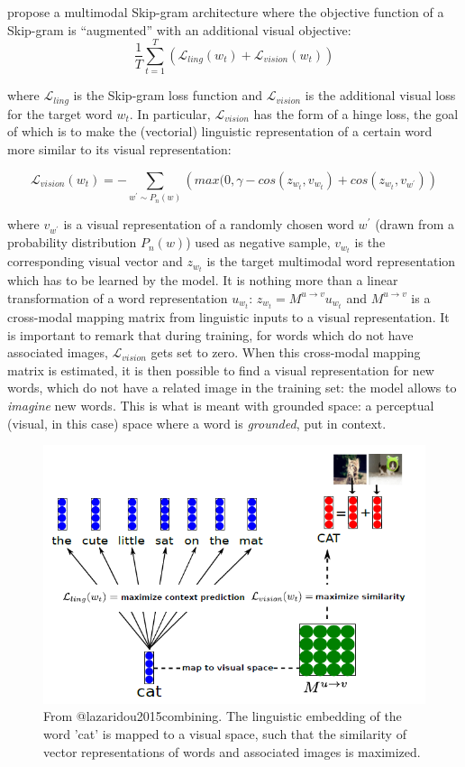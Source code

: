 \documentclass[
]{krantz}
\begin{document}
\citet{lazaridou2015combining} propose a multimodal Skip-gram architecture where the objective function of a Skip-gram is ``augmented'' with an additional visual objective: \[\frac{1}{T}\sum_{t=1}^{T}\left(\mathcal{L}_{ling}(w_{t})+\mathcal{L}_{vision}(w_{t})\right)\]

where \(\mathcal{L}_{ling}\) is the Skip-gram loss function and \(\mathcal{L}_{vision}\) is the additional visual loss for the target word \(w_{t}\). In particular, \(\mathcal{L}_{vision}\) has the form of a hinge loss, the goal of which is to make the (vectorial) linguistic representation of a certain word more similar to its visual representation:

\[\mathcal{L}_{vision}(w_{t})=-\sum_{w^{'}\sim P_{n}(w)}\left(max(0,\gamma-cos(z_{w_{t}},v_{w_{t}})+cos(z_{w_{t}},v_{w^{'}})\right)\]

where \(v_{w^{'}}\) is a visual representation of a randomly chosen word \(w^{'}\) (drawn from a probability distribution \(P_{n}(w)\)) used as negative sample, \(v_{w_{t}}\) is the corresponding visual vector and \(z_{w_{t}}\) is the target multimodal word representation which has to be learned by the model. It is nothing more than a linear transformation of a word representation \(u_{w_{t}}\): \(z_{w_{t}}=M^{u\rightarrow v}u_{w_{t}}\) and \(M^{u\rightarrow v}\) is a cross-modal mapping matrix from linguistic inputs to a visual representation. It is important to remark that during training, for words which do not have associated images, \(\mathcal{L}_{vision}\) gets set to zero. When this cross-modal mapping matrix is estimated, it is then possible to find a visual representation for new words, which do not have a related image in the training set: the model allows to \emph{imagine} new words. This is what is meant with grounded space: a perceptual (visual, in this case) space where a word is \emph{grounded}, put in context.

\begin{figure}

{\centering \includegraphics[width=0.8\linewidth]{figures/02-03-img-support-text/img-lazaridou2015combining01} 

}

\caption{From @lazaridou2015combining. The linguistic embedding of the word 'cat' is mapped to a visual space, such that the similarity of vector representations of words and associated images is maximized.}\label{fig:img-lazaridou2015-01}
\end{figure}
\end{document}
